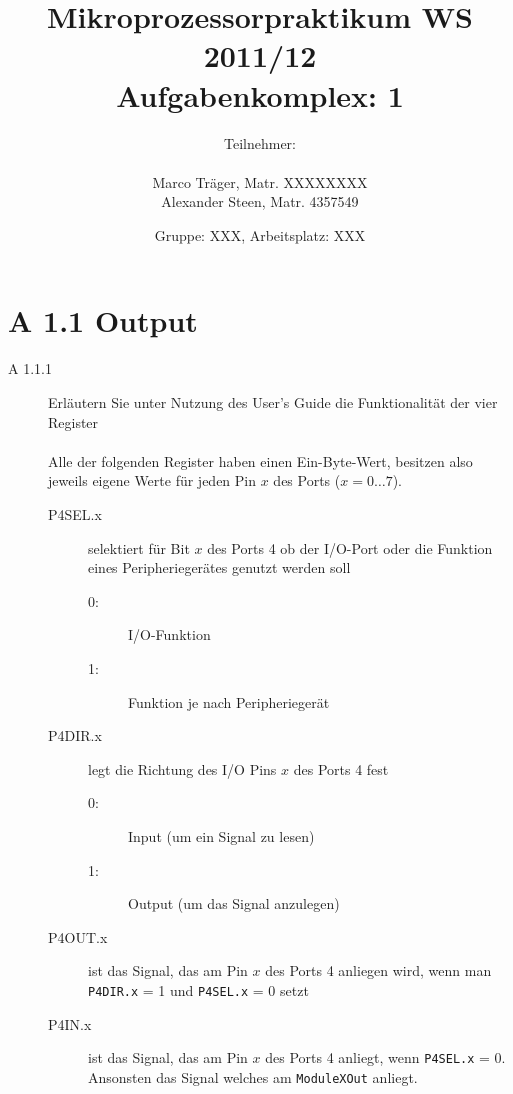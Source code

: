 \documentclass[11pt,a4paper,ngerman]{article}
\author{Teilnehmer:\\ \\Marco Träger, Matr. XXXXXXXX\\Alexander Steen, Matr. 4357549}
\date{Gruppe: XXX, Arbeitsplatz: XXX}
\title{Mikroprozessorpraktikum WS 2011/12\\ Aufgabenkomplex: 1}
\begin{document}

\maketitle
\thispagestyle{fancy}
\newpage
\section*{A 1.1 Output}

\begin{description}
	\item[A 1.1.1] Erläutern Sie unter Nutzung des User's Guide die Funktionalität der vier Register \\ \\
Alle der folgenden Register haben einen Ein-Byte-Wert, besitzen also jeweils eigene Werte für jeden Pin $x$ des Ports ($x = 0\ldots 7$).
		\begin{description}
			\item[P4SEL.x] selektiert für Bit $x$ des Ports 4 ob der I/O-Port oder die Funktion eines Peripheriegerätes genutzt werden soll
			\begin{description}
				\item[0:] I/O-Funktion
				\item[1:] Funktion je nach Peripheriegerät
			\end{description}
			\item[P4DIR.x] legt die Richtung des I/O Pins $x$ des Ports 4 fest
			\begin{description}
				\item[0:] Input (um ein Signal zu lesen)
				\item[1:] Output (um das Signal anzulegen)
			\end{description}
			\item[P4OUT.x] ist das Signal, das am Pin $x$ des Ports 4 anliegen wird, wenn man \texttt{P4DIR.x} = 1 und \texttt{P4SEL.x} = 0 setzt
			\item[P4IN.x] ist das Signal, das am Pin $x$ des Ports 4 anliegt, wenn \texttt{P4SEL.x} = 0. Ansonsten das Signal welches am \texttt{ModuleXOut} anliegt.
		\end{description}
	


\end{description}
\end{document}
